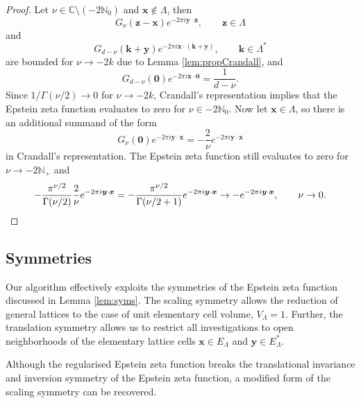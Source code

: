 \documentclass[]{amsart}
\numberwithin{mythm}{section}
\begin{document}
\begin{proof}
Let \(\nu\in\mathds C\setminus(-2\mathds N_0)\) and \(\bm x\notin\Lambda\), then
\[G_\nu(\bm z - \bm x) e^{-2 \pi  i  \bm y \cdot \bm z}, \qquad \bm z \in \Lambda\]
and
\[G_{d-\nu}(\bm k + \bm y) e^{-2 \pi  i  \bm x \cdot ( \bm k + \bm y)}, \qquad \bm k \in \Lambda^*\]
are bounded for \(\nu\to -2k\) due to 
Lemma \ref{lem:propCrandall}, and 
\[G_{d-\nu}(\bm 0) e^{-2 \pi  i  \bm x \cdot \bm 0} = \frac{1}{d-\nu}.\]
Since \(1/\Gamma(\nu/2)\to 0\) for \(\nu\to-2k\), 
Crandall's representation implies that the Epstein zeta function 
evaluates to zero for \(\nu\in -2 \mathds N_0\).
Now let \(\bm x\in\Lambda\), so there is an additional summand of the form
\[G_\nu(\bm 0) e^{-2 \pi  i  \bm y \cdot \bm x} = -\frac{2}{\nu} e^{-2 \pi  i  \bm y \cdot \bm x}\]
in Crandall's representation.
The Epstein zeta function still evaluates to zero for \(\nu\to -2\mathds N_+\)
and 
\[-\frac{\pi^{\nu/2}}{\Gamma(\nu/2)} \frac{2}{\nu} e^{-2 \pi  i  \bm y \cdot \bm x} = -\frac{\pi^{\nu/2}}{\Gamma(\nu/2 + 1)} e^{-2 \pi  i  \bm y \cdot \bm x} \rightarrow -e^{-2 \pi  i  \bm y \cdot \bm x}
,\qquad 
\nu \to 0.
\qedhere
\]
\end{proof}

\subsection{Symmetries}
\label{sec:syms}

Our algorithm effectively exploits the symmetries of the Epstein zeta function discussed in 
Lemma \ref{lem:syms}.
The scaling symmetry allows the reduction of general lattices to the case of unit elementary cell volume, $V_\Lambda = 1$.
Further, the translation symmetry allows us to restrict all investigations to open neighborhoods of
the elementary lattice cells  $\bm x \in E_\Lambda$ and $\bm y \in E_\Lambda^*$.


Although the regularised Epstein zeta function breaks the translational invariance and inversion symmetry of the Epstein zeta function, a modified form of the scaling symmetry can be recovered.
\end{document}
